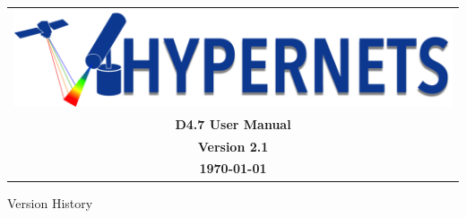 \documentclass[a4paper,11pt,notitlepage]{article}
\newcommand{\numVersion}{2.1}
\newcommand{\titleDoc}{D4.7 User Manual}
\begin{document}
\hypersetup{pageanchor=false}
\begin{titlepage}
\thispagestyle{fancy}
\vspace*{8mm}
\begin{center}
    \begin{tabularx}{\textwidth}{c}
        \includegraphics[scale=.23]{logoHypernets.png}
        \vspace{2mm} \\
        \Large{\textbf{\titleDoc}} \\
        \Large{\textbf{Version \numVersion}} \\
        \Large{\textbf{\today}}
    \end{tabularx}
\end{center}
\end{titlepage}
\setcounter{page}{2}
\noindent Version History
\vspace{8pt}
\newline
\end{document}
